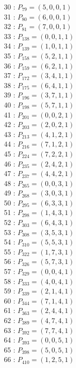\documentclass{article}
\begin{document}
{\begin{multicols}{3}
30 : $P_{79}=( 5, 0, 0, 1 )$\\
31 : $P_{80}=( 6, 0, 0, 1 )$\\
32 : $P_{81}=( 7, 0, 0, 1 )$\\
33 : $P_{138}=( 0, 0, 1, 1 )$\\
34 : $P_{139}=( 1, 0, 1, 1 )$\\
35 : $P_{158}=( 5, 2, 1, 1 )$\\
36 : $P_{159}=( 6, 2, 1, 1 )$\\
37 : $P_{172}=( 3, 4, 1, 1 )$\\
38 : $P_{175}=( 6, 4, 1, 1 )$\\
39 : $P_{196}=( 3, 7, 1, 1 )$\\
40 : $P_{198}=( 5, 7, 1, 1 )$\\
41 : $P_{201}=( 0, 0, 2, 1 )$\\
42 : $P_{203}=( 2, 0, 2, 1 )$\\
43 : $P_{213}=( 4, 1, 2, 1 )$\\
44 : $P_{216}=( 7, 1, 2, 1 )$\\
45 : $P_{224}=( 7, 2, 2, 1 )$\\
46 : $P_{235}=( 2, 4, 2, 1 )$\\
47 : $P_{237}=( 4, 4, 2, 1 )$\\
48 : $P_{265}=( 0, 0, 3, 1 )$\\
49 : $P_{268}=( 3, 0, 3, 1 )$\\
50 : $P_{295}=( 6, 3, 3, 1 )$\\
51 : $P_{298}=( 1, 4, 3, 1 )$\\
52 : $P_{303}=( 6, 4, 3, 1 )$\\
53 : $P_{308}=( 3, 5, 3, 1 )$\\
54 : $P_{310}=( 5, 5, 3, 1 )$\\
55 : $P_{322}=( 1, 7, 3, 1 )$\\
56 : $P_{326}=( 5, 7, 3, 1 )$\\
57 : $P_{329}=( 0, 0, 4, 1 )$\\
58 : $P_{333}=( 4, 0, 4, 1 )$\\
59 : $P_{339}=( 2, 1, 4, 1 )$\\
60 : $P_{344}=( 7, 1, 4, 1 )$\\
61 : $P_{363}=( 2, 4, 4, 1 )$\\
62 : $P_{389}=( 4, 7, 4, 1 )$\\
63 : $P_{392}=( 7, 7, 4, 1 )$\\
64 : $P_{393}=( 0, 0, 5, 1 )$\\
65 : $P_{398}=( 5, 0, 5, 1 )$\\
66 : $P_{410}=( 1, 2, 5, 1 )$\\

\end{multicols}}
\end{document}

